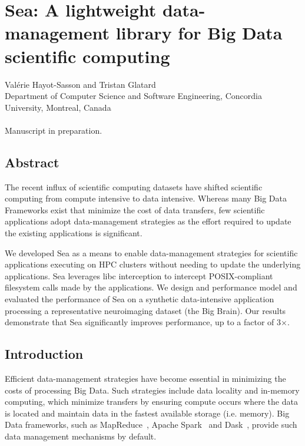 \chapter{Sea: A lightweight data-management library for Big Data scientific computing}\label{chapter:sea-comp}

Val\'erie Hayot-Sasson and Tristan Glatard \\
\begingroup \footnotesize Department of Computer Science and Software
Engineering, Concordia University, Montreal, Canada \\
\endgroup 
\vspace{5pt} \\
Manuscript in preparation. \\

\section{Abstract}

The recent influx of scientific computing datasets have shifted scientific computing
from compute intensive to data intensive. Whereas many Big Data Frameworks exist that
minimize the cost of data transfers, few scientific applications adopt data-management
strategies as the effort required to update the existing applications is significant.

We developed Sea as a means to enable data-management strategies for scientific applications
executing on HPC clusters
without needing to update the underlying applications. Sea leverages libc interception to intercept
POSIX-compliant filesystem calls made by the applications. We design and performance model and
evaluated the performance of Sea on a synthetic data-intensive application processing a representative 
neuroimaging dataset (the Big Brain). Our results demonstrate that Sea significantly improves 
performance, up to a factor of 3$\times$. 

\section{Introduction}\label{sec:introduction}
Efficient data-management
strategies have become essential in minimizing the costs of processing Big Data.
Such strategies include data locality and in-memory computing, which minimize
transfers by ensuring compute occurs where the data is located and maintain data
in the fastest available storage (i.e. memory). Big Data frameworks, such as
MapReduce~\cite{dean2008mapreduce}, Apache Spark~\cite{zaharia2016apache} and
Dask~\cite{rocklin2015dask}, provide such data management mechanisms by default.

